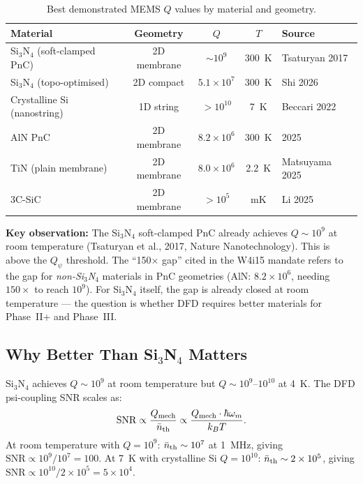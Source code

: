 \documentclass[11pt]{article}
\theoremstyle{definition}
\theoremstyle{remark}
\newcommand{\ee}[1]{\times 10^{#1}}
\newcommand{\Qpsi}{Q_\psi}
\newcommand{\Qmech}{Q_{\rm mech}}
\newcommand{\SNR}{\mathrm{SNR}}
\begin{document}
\begin{table}[H]
\centering
\caption{Best demonstrated MEMS $Q$ values by material and geometry.}
\renewcommand{\arraystretch}{1.3}
\begin{tabular}{p{3.5cm}cccl}
\toprule
\textbf{Material} & \textbf{Geometry} & \textbf{$Q$} & \textbf{$T$} & \textbf{Source} \\
\midrule
Si$_3$N$_4$ (soft-clamped PnC) & 2D membrane & $\sim 10^9$ & 300~K & Tsaturyan 2017 \\
Si$_3$N$_4$ (topo-optimised) & 2D compact & $5.1\ee{7}$ & 300~K & Shi 2026 \\
Crystalline Si (nanostring) & 1D string & $>10^{10}$ & 7~K & Beccari 2022 \\
AlN PnC & 2D membrane & $8.2\ee{6}$ & 300~K & 2025 \\
TiN (plain membrane) & 2D membrane & $8.0\ee{6}$ & 2.2~K & Matsuyama 2025 \\
3C-SiC & 2D membrane & $>10^5$ & mK & Li 2025 \\
\bottomrule
\end{tabular}
\end{table}

\textbf{Key observation:} The Si$_3$N$_4$ soft-clamped PnC already
achieves $Q \sim 10^9$ at room temperature (Tsaturyan et al., 2017,
Nature Nanotechnology). This is above the $\Qpsi$ threshold.
The ``150$\times$ gap'' cited in the W4i15 mandate refers to the
gap for \textit{non-Si$_3$N$_4$} materials in PnC geometries
(AlN: $8.2\ee{6}$, needing $150\times$ to reach $10^9$). For
Si$_3$N$_4$ itself, the gap is already closed at room temperature
--- the question is whether DFD requires better materials for
Phase~II+ and Phase~III.

\subsection{Why Better Than Si$_3$N$_4$ Matters}

Si$_3$N$_4$ achieves $Q \sim 10^9$ at room temperature but
$Q \sim 10^{9}$--$10^{10}$ at 4~K. The DFD psi-coupling
SNR scales as:
\begin{equation}
\SNR \propto \frac{\Qmech}{\bar{n}_{\rm th}} \propto
\frac{\Qmech \cdot \hbar \omega_m}{k_B T}.
\label{eq:snr_scaling}
\end{equation}
At room temperature with $Q = 10^9$: $\bar{n}_{\rm th} \sim 10^7$
at 1~MHz, giving $\SNR \propto 10^9/10^7 = 100$.
At 7~K with crystalline Si $Q = 10^{10}$: $\bar{n}_{\rm th} \sim
2\ee{5}$, giving $\SNR \propto 10^{10}/2\ee{5} = 5\ee{4}$.
\end{document}

